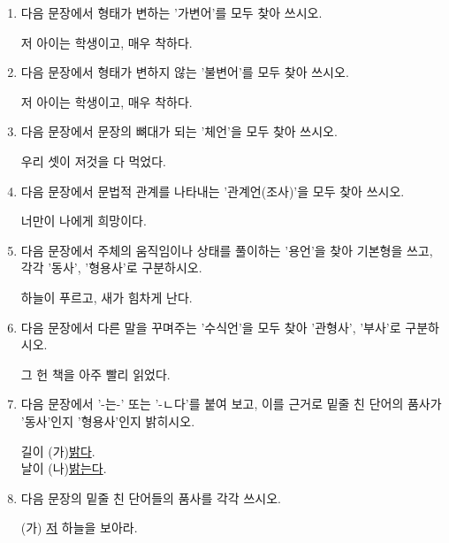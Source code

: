\documentclass[fs9,seriesRus]{korfarm-base}
\begin{document}
\kfActivityBg {}
\par{}\par\nopagebreak[4]\smallskip\nopagebreak[4]
\begin{enumerate}[leftmargin=22pt, itemsep=6pt, topsep=4pt, label=\textbf{\arabic*.}]
\item 다음 문장에서 형태가 변하는 '가변어'를 모두 찾아 쓰시오.
\begin{kfEvidence}저 아이는 학생이고, 매우 착하다.\end{kfEvidence}
\item 다음 문장에서 형태가 변하지 않는 '불변어'를 모두 찾아 쓰시오.
\begin{kfEvidence}저 아이는 학생이고, 매우 착하다.\end{kfEvidence}
\item 다음 문장에서 문장의 뼈대가 되는 '체언'을 모두 찾아 쓰시오.
\begin{kfEvidence}우리 셋이 저것을 다 먹었다.\end{kfEvidence}
\item 다음 문장에서 문법적 관계를 나타내는 '관계언(조사)'을 모두 찾아 쓰시오.
\begin{kfEvidence}너만이 나에게 희망이다.\end{kfEvidence}
\item 다음 문장에서 주체의 움직임이나 상태를 풀이하는 '용언'을 찾아 기본형을 쓰고, 각각 '동사', '형용사'로 구분하시오.
\begin{kfEvidence}하늘이 푸르고, 새가 힘차게 난다.\end{kfEvidence}
\item 다음 문장에서 다른 말을 꾸며주는 '수식언'을 모두 찾아 '관형사', '부사'로 구분하시오.
\begin{kfEvidence}그 헌 책을 아주 빨리 읽었다.\end{kfEvidence}
\item 다음 문장에서 '-는-' 또는 '-ㄴ다'를 붙여 보고, 이를 근거로 밑줄 친 단어의 품사가 '동사'인지 '형용사'인지 밝히시오.
\begin{kfEvidence}길이 (가)\uline{밝다}. \\\relax
날이 (나)\uline{밝는다}.\end{kfEvidence}
\item 다음 문장의 밑줄 친 단어들의 품사를 각각 쓰시오.
\begin{kfEvidence}(가) \uline{저} 하늘을 보아라. \\\relax

\end{kfEvidence}
\end{enumerate}
\end{document}
